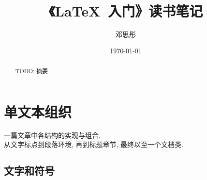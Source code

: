\documentclass[UTF8]{ctexart}
\title{《\LaTeX\ 入门》读书笔记}
\author{邓思彤}
\date{\today}
\begin{document}
\maketitle
\tableofcontents

\begin{abstract}
    TODO: 摘要
\end{abstract}

\section{单文本组织}

    一篇文章中各结构的实现与组合.\\
    从文字标点到段落环境, 再到标题章节, 最终以至一个文档类.

    \subsection{文字和符号}
\end{document}
